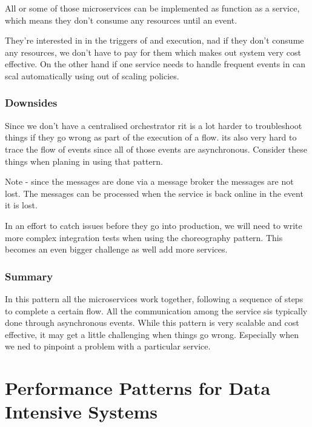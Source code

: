 \documentclass[a4paper, 11pt]{book}
\begin{document}
    All or some of those microservices can be implemented as function as a service, which means they don't consume any resources until an event.

    They're interested in in the triggers of and execution, nad if they don't consume any resources, we don't have to pay for them which makes out system very cost effective.
    On the other hand if one service needs to handle frequent events in can scal automatically using out of scaling policies.

    \subsubsection{Downsides}
    Since we don't have a centralised orchestrator rit is a lot harder to troubleshoot things if they go wrong as part of the execution of a flow.
    its also very hard to trace the flow of events since all of those events are asynchronous.
    Consider these things when planing in using that pattern.

    Note - since the messages are done via a message broker the messages are not lost.
    The messages can be processed when the service is back online in the event it is lost.

    In an effort to catch issues before they go into production, we will need to write more complex integration tests when using the choreography pattern.
    This becomes an even bigger challenge as well add more services.

    \subsubsection{Summary}
    In this pattern all the microservices work together, following a sequence of steps to complete a certain flow.
    All the communication among the service sis typically done through asynchronous events.
    While this pattern is very scalable and cost effective, it may get a little challenging when things go wrong.
    Especially when we ned to pinpoint a problem with a particular service.

    \section{Performance Patterns for Data Intensive Systems}
\end{document}
